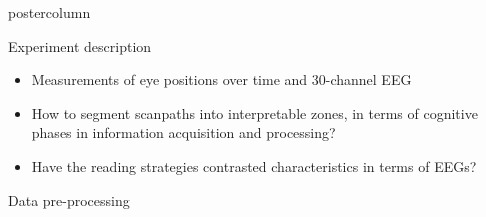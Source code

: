 \documentclass[final,hyperref={pdfpagelabels=false}]{beamer}
\begin{document}
\begin{frame}
\begin{columns}
\begin{column}{.49\textwidth}
\begin{beamercolorbox}[center,wd=\textwidth]{postercolumn}
\begin{minipage}[T]{.95\textwidth}
{\begin{block}{Experiment description}
                \begin{itemize}
                    \item[\bullet] Measurements of eye positions over time and 30-channel EEG
                    \vskip1cm
                    \item[\hookrightarrow] How to segment scanpaths into interpretable zones, in terms of cognitive phases in information acquisition and processing?
                    \item[\hookrightarrow] Have the reading strategies contrasted characteristics in terms of EEGs?
                \end{itemize}
            \end{block}

            \vfill
            \begin{block}{Data pre-processing}


\end{block}}
\end{minipage}
\end{beamercolorbox}
\end{column}
\end{columns}
\end{frame}
\end{document}
